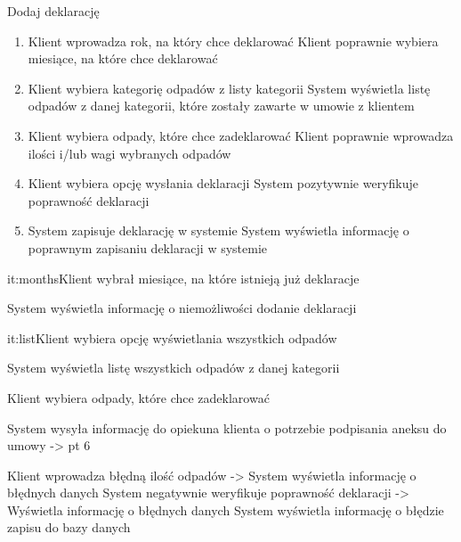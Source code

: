 	\begin{usecase}{Dodaj deklarację} 
		\author{Beata Obrok}
		\maketitle
		\begin{scenario}
			\begin{enumerate}
				\item Klient wprowadza rok, na który chce deklarować
				 Klient poprawnie wybiera miesiące, na które chce deklarować
				\item Klient wybiera kategorię odpadów z listy kategorii
				 System wyświetla listę odpadów z danej kategorii, które zostały zawarte w umowie z klientem
				\item Klient wybiera odpady, które chce zadeklarować
				 Klient poprawnie wprowadza ilości i/lub wagi wybranych odpadów
				\item Klient wybiera opcję wysłania deklaracji
				 System pozytywnie weryfikuje poprawność deklaracji
				\item System zapisuje deklarację w systemie
				 System wyświetla informację o poprawnym zapisaniu deklaracji w systemie
			\end{enumerate}
		\end{scenario}
		\begin{extensions}
			\begin{extlist}{it:months}{Klient wybrał miesiące, na które istnieją już deklaracje}
				\item System wyświetla informację o niemożliwości dodanie deklaracji
			\end{extlist}
			\begin{extlist}{it:list}{Klient wybiera opcję wyświetlania wszystkich odpadów}
				\item System wyświetla listę wszystkich odpadów z danej kategorii 
				\item Klient wybiera odpady, które chce zadeklarować 
				\item System wysyła informację do opiekuna klienta o potrzebie podpisania aneksu do umowy -> pt 6 
			\end{extlist}
			\begin{enumerate}
			 Klient wprowadza błędną ilość odpadów -> System wyświetla informację o błędnych danych 
			 System negatywnie weryfikuje poprawność deklaracji -> Wyświetla informację o błędnych danych 
			 System wyświetla informację o błędzie zapisu do bazy danych 
			\end{enumerate}
		\end{extensions}
\end{usecase}

